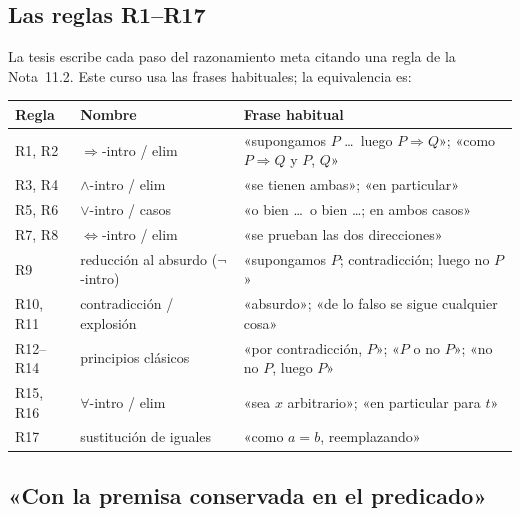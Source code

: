 \documentclass[11pt,a4paper]{article}
\begin{document}
\subsection{Las reglas R1--R17}

La tesis escribe cada paso del razonamiento meta citando una regla de la
Nota~11.2. Este curso usa las frases habituales; la equivalencia es:
\begin{center}
{\small
\begin{tabular}{@{}lll@{}}
\toprule
\textbf{Regla} & \textbf{Nombre} & \textbf{Frase habitual}\\
\midrule
R1, R2 & \(\Rightarrow\)-intro / elim & «supongamos \(P\) \dots\ luego \(P\Rightarrow Q\)»; «como \(P\Rightarrow Q\) y \(P\), \(Q\)»\\
R3, R4 & \(\wedge\)-intro / elim & «se tienen ambas»; «en particular»\\
R5, R6 & \(\vee\)-intro / casos & «o bien \dots\ o bien \dots; en ambos casos»\\
R7, R8 & \(\iff\)-intro / elim & «se prueban las dos direcciones»\\
R9 & reducción al absurdo (\(\neg\)-intro) & «supongamos \(P\); contradicción; luego no \(P\)»\\
R10, R11 & contradicción / explosión & «absurdo»; «de lo falso se sigue cualquier cosa»\\
R12--R14 & principios clásicos & «por contradicción, \(P\)»; «\(P\) o no \(P\)»; «no no \(P\), luego \(P\)»\\
R15, R16 & \(\forall\)-intro / elim & «sea \(x\) arbitrario»; «en particular para \(t\)»\\
R17 & sustitución de iguales & «como \(a=b\), reemplazando»\\
\bottomrule
\end{tabular}}
\end{center}

\subsection{«Con la premisa conservada en el predicado»}
\end{document}
